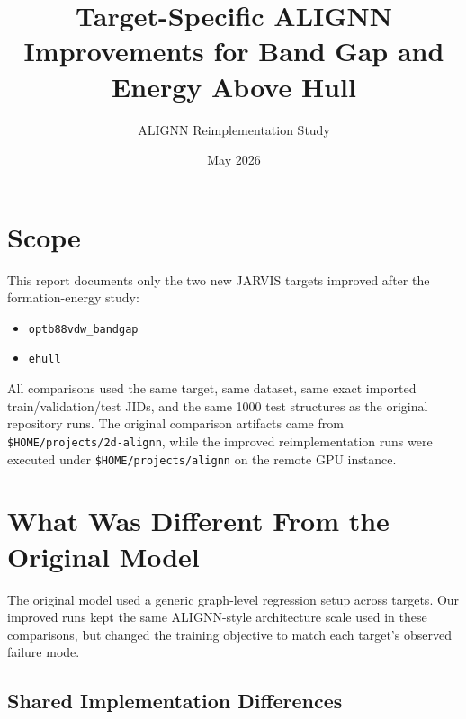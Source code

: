 \documentclass[11pt]{article}
\title{Target-Specific ALIGNN Improvements for Band Gap and Energy Above Hull}
\author{ALIGNN Reimplementation Study}
\date{May 2026}
\begin{document}
\maketitle

\section{Scope}

This report documents only the two new JARVIS targets improved after the formation-energy study:
\begin{itemize}
  \item \texttt{optb88vdw\_bandgap}
  \item \texttt{ehull}
\end{itemize}

All comparisons used the same target, same dataset, same exact imported train/validation/test JIDs, and the same 1000 test structures as the original repository runs.  The original comparison artifacts came from \texttt{\$HOME/projects/2d-alignn}, while the improved reimplementation runs were executed under \texttt{\$HOME/projects/alignn} on the remote GPU instance.

\section{What Was Different From the Original Model}

The original model used a generic graph-level regression setup across targets.  Our improved runs kept the same ALIGNN-style architecture scale used in these comparisons, but changed the training objective to match each target's observed failure mode.

\subsection{Shared Implementation Differences}
\end{document}
